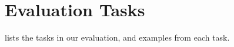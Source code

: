 \section{Evaluation Tasks}
\label{app:tasks}

 lists the tasks in our evaluation, and examples from each task.


